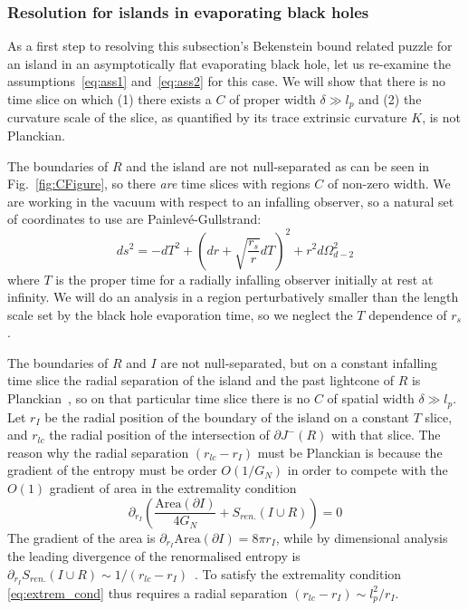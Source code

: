 \documentclass[a4paper,11pt]{article}
\newcommand{\cts}[1]{\ignorespaces}
\def\bne{\begin{equation}}
\def\ene{\end{equation}}
\newcommand{\del}{\partial}
\begin{document}
\subsubsection{Resolution for islands in evaporating black holes}

As a first step to resolving this subsection's Bekenstein bound related puzzle for an island in an asymptotically flat evaporating black hole, let us re-examine the assumptions~\eqref{eq:ass1} and~\eqref{eq:ass2} for this case. We will show that there is no time slice on which (1) there exists a $C$ of proper width $\delta \gg l_p$ and (2) the curvature scale of the slice, as quantified by its trace extrinsic curvature $K$, is not Planckian. 

The boundaries of $R$ and the island are not null-separated as can be seen in Fig.~\ref{fig:CFigure}, so there \textit{are} time slices with regions $C$ of non-zero width. We are working in the vacuum with respect to an infalling observer, so a natural set of coordinates to use are Painlev\'e-Gullstrand:
\bne ds^2 = - dT^2 + \left (dr + \sqrt{\frac{r_s}{r}}dT \right)^2 + r^2 d\Omega_{d-2}^2 \ene
where $T$ is the proper time for a radially infalling observer initially at rest at infinity. We will do an analysis in a region  perturbatively smaller than the length scale set by the black hole evaporation time, so we neglect the $T$ dependence of $r_s$.

The boundaries of $R$ and $I$ are not null-separated, but on a constant infalling time slice the radial separation of the island and the past lightcone of $R$ is Planckian~\cite{Penington2019}, so on that particular time slice there is no $C$ of spatial width $\delta \gg l_p$.
Let $r_{I}$ be the radial position of the boundary of the island on a constant $T$ slice, and $r_{lc}$ the radial position of the intersection of $\del J^- (R)$ with that slice. The reason why the radial separation $(r_{lc} - r_{I})$ must be Planckian is because the gradient of the entropy must be order $O(1/G_N)$ in order to compete with the $O(1)$ gradient of area in the extremality condition
\bne \label{eq:extrem_cond} \del_{r_I} \left ( \frac{\text{Area}(\del I)}{4G_N} + S_{ren.} (I\cup R) \right ) = 0 \ene
The gradient of the area is $\del_{r_I} \text{Area}(\del I) = 8\pi r_I$, while by dimensional analysis the leading divergence of the renormalised entropy is $\del_{r_I} S_{ren.} (I \cup R) \sim 1/(r_{lc} - r_I)$~\cite{Bousso2021}.
To satisfy the extremality condition \eqref{eq:extrem_cond} thus requires a radial separation $(r_{lc} - r_I) \sim l_p^2 / r_I$. 
\end{document}
